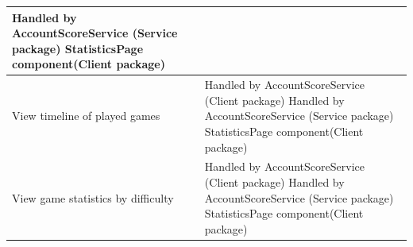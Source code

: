 \documentclass[11pt,a4paper]{article}
\begin{document}
\begin{table}
\begin{tabular}{|p{}|p{}|}
Handled by AccountScoreService (Service package)\newline
StatisticsPage component(Client package)\\
\hline
View timeline of played games& Handled by AccountScoreService (Client package)\newline
Handled by AccountScoreService (Service package)\newline
StatisticsPage component(Client package)\\
\hline
View game statistics by difficulty& Handled by AccountScoreService (Client package)\newline
Handled by AccountScoreService (Service package)\newline
StatisticsPage component(Client package)\\
\hline
\end{tabular}
\end{table}
\end{document}
